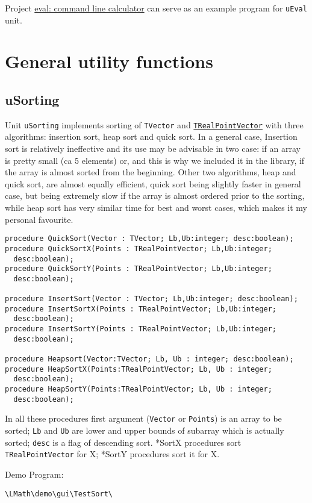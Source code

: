 \documentclass[12pt,a4paper,oneside]{article}
\newcommand{\code}[1]{\texttt{#1}}
\begin{document}
Project \href{https://sourceforge.net/projects/eval-command-line-calculator/}{eval: command line calculator} can serve as an example program for \code{uEval} unit.
\section{General utility functions}
\subsection{uSorting}
Unit \code{uSorting} implements sorting of \code{TVector} and \hyperref[sec:trealpoint]{\code{TRealPointVector}} with three algorithms: insertion sort, heap sort and quick sort. In a general case, Insertion sort is relatively ineffective and its use may be advisable in two case: if an array is pretty small (ca 5 elements) or, and this is why we included it in the library, if the array is almost sorted from the beginning. Other two algorithms, heap and quick sort, are almost equally efficient, quick sort being slightly faster in general case, but being extremely slow if the array is almost ordered prior to the sorting, while heap sort has very similar time for best and worst cases, which makes it my personal favourite.
\begin{verbatim}
procedure QuickSort(Vector : TVector; Lb,Ub:integer; desc:boolean);
procedure QuickSortX(Points : TRealPointVector; Lb,Ub:integer;
  desc:boolean);
procedure QuickSortY(Points : TRealPointVector; Lb,Ub:integer;
  desc:boolean);

procedure InsertSort(Vector : TVector; Lb,Ub:integer; desc:boolean);
procedure InsertSortX(Points : TRealPointVector; Lb,Ub:integer;
  desc:boolean);
procedure InsertSortY(Points : TRealPointVector; Lb,Ub:integer;
  desc:boolean);

procedure Heapsort(Vector:TVector; Lb, Ub : integer; desc:boolean);
procedure HeapSortX(Points:TRealPointVector; Lb, Ub : integer;
  desc:boolean);
procedure HeapSortY(Points:TRealPointVector; Lb, Ub : integer;
  desc:boolean);
\end{verbatim}
In all these procedures first argument (\code{Vector} or \code{Points}) is an array to be sorted; \code{Lb} and \code{Ub} are lower and upper bounds of subarray which is actually sorted; \code{desc} is a flag of descending sort. *SortX procedures sort \code{TRealPointVector} for X; *SortY procedures sort it for X.

Demo Program: \begin{verbatim}
\LMath\demo\gui\TestSort\
\end{verbatim}
\end{document}
